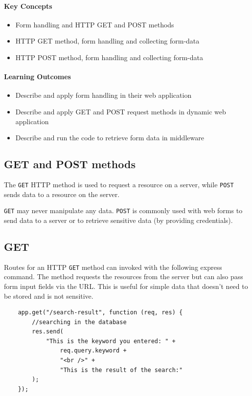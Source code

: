 \begin{mdframed}

\paragraph{Key Concepts}
\begin{itemize}[label={\checkmark}]
    \item Form handling and HTTP GET and POST methods
    \item HTTP GET method, form handling and collecting form-data
    \item HTTP POST method, form handling and collecting form-data
\end{itemize}

\paragraph{Learning Outcomes}
\begin{itemize}[label={\checkmark}]
\item Describe and apply form handling in their web application
\item Describe and apply GET and POST request methods in dynamic web application
\item Describe and run the code to retrieve form data in middleware
\end{itemize}
\end{mdframed}

\subsection{GET and POST methods}
The \texttt{GET} HTTP method is used to request a resource on a server, while \texttt{POST} sends data to a resource on the server.

\texttt{GET} may never manipulate any data. \texttt{POST} is commonly used with web forms to send data to a server or to retrieve sensitive data (by providing credentials).

\subsection{GET}

Routes for an HTTP \texttt{GET} method can invoked with the following express command. The method requests the resources from the server but can also pass form input fields via the URL. This is useful for simple data that doesn't need to be stored and is not sensitive.
\begin{verbatim}
	app.get("/search-result", function (req, res) {
		//searching in the database
		res.send(
			"This is the keyword you entered: " +
				req.query.keyword +
				"<br />" +
				"This is the result of the search:"
		);
	});
   \end{verbatim}

